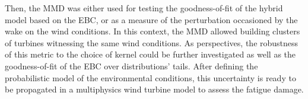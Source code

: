 Then, the MMD was either used for testing the goodness-of-fit of the hybrid model based on the EBC, or as a measure of the perturbation occasioned by the wake on the wind conditions. 
In this context, the MMD allowed building clusters of turbines witnessing the same wind conditions. 
As perspectives, the robustness of this metric to the choice of kernel could be further investigated as well as the goodness-of-fit of the EBC over distributions' tails. 
After defining the probabilistic model of the environmental conditions, this uncertainty is ready to be propagated in a multiphysics wind turbine model to assess the fatigue damage. 
